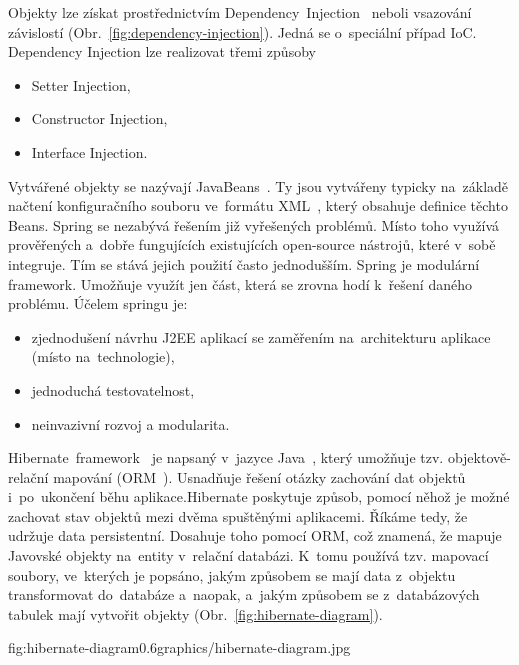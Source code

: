 Objekty lze získat prostřednictvím Dependency~Injection~\cite{dependency-injection} neboli vsazování závislostí (Obr.~\ref{fig:dependency-injection}). Jedná se o~speciální případ IoC. Dependency Injection lze realizovat třemi způsoby
\begin{itemize}
	\setlength{\parskip}{0pt}
	\setlength{\itemsep}{0pt}
	\item {Setter Injection,}
	\item {Constructor Injection,}
	\item {Interface Injection.}
\end{itemize}

Vytvářené objekty se nazývají JavaBeans~\cite{java-beans}. Ty jsou vytvářeny typicky na~základě načtení konfiguračního souboru ve~formátu XML~\cite{xml}, který obsahuje definice těchto Beans. Spring se nezabývá řešením již vyřešených problémů. Místo toho využívá prověřených a~dobře fungujících existujících open-source nástrojů, které v~sobě integruje. Tím se stává jejich použití často jednodušším. Spring je modulární framework. Umožňuje využít jen část, která se zrovna hodí k~řešení daného problému. Účelem springu je:
\begin{itemize}
	\setlength{\parskip}{0pt}
	\setlength{\itemsep}{0pt}
	\item {zjednodušení návrhu J2EE aplikací se zaměřením na~architekturu aplikace (místo na~technologie),}
	\item {jednoduchá testovatelnost,}
	\item {neinvazivní rozvoj a modularita.}
\end{itemize}

Hibernate~framework~\cite{hibernate-framework} je napsaný v~jazyce Java~\cite{java}, který umožňuje tzv. objektově-relační mapování (ORM~\cite{orm}). Usnadňuje řešení otázky zachování dat objektů i~po~ukončení běhu aplikace.Hibernate poskytuje způsob, pomocí něhož je možné zachovat stav objektů mezi dvěma spuštěnými aplikacemi. Říkáme tedy, že udržuje data persistentní. Dosahuje toho pomocí ORM, což znamená, že mapuje Javovské objekty na~entity v~relační databázi. K~tomu používá tzv. mapovací soubory, ve~kterých je popsáno, jakým způsobem se mají data z~objektu transformovat do~databáze a~naopak, a~jakým způsobem se z~databázových tabulek mají vytvořit objekty (Obr.~\ref{fig:hibernate-diagram}).

 {fig:hibernate-diagram}{0.6}{graphics/hibernate-diagram.jpg}

